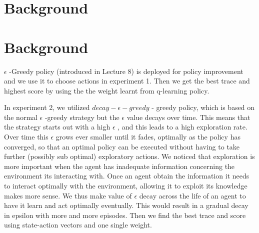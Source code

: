 \section{Background}
\section{Background}
$\epsilon$
-Greedy policy (introduced in Lecture 8) is deployed for policy improvement and we use it to choose actions in experiment 1. Then we get the best trace and highest score by using the the weight learnt from q-learning policy.

In experiment 2, we utilized
$decay-\epsilon-greedy$
- greedy policy, which is based on the normal
$\epsilon$
-greedy strategy but the 
$\epsilon$
value decays over time. This
means that the strategy starts out with a high 
$\epsilon$
, and this leads to a high exploration rate. 
Over time this
$\epsilon$
grows ever smaller until it fades, optimally as the policy has converged, so that an optimal policy can be executed
without having to take further (possibly sub optimal) exploratory actions. We noticed that exploration is more important when the agent has inadequate information concerning the environment its interacting with. Once an agent obtain the information it needs to interact optimally with the environment, allowing it to exploit its knowledge makes more sense. We thus make value of 
$\epsilon$
decay across the life of an agent to have it learn and act optimally eventually. This would result in a gradual decay in epsilon with more and more episodes. Then we find the best trace and score using state-action vectors and one single weight.
